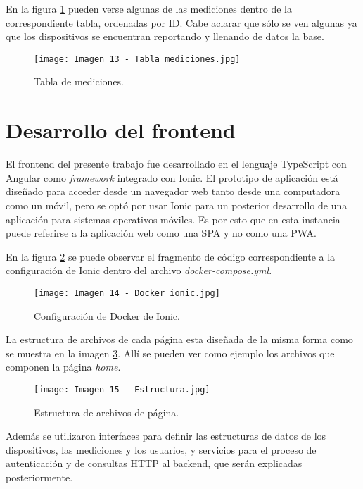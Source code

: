 En la figura \ref{fig:13} pueden verse algunas de las mediciones dentro de la correspondiente tabla, ordenadas por ID. Cabe aclarar que sólo se ven algunas ya que los dispositivos se encuentran reportando y llenando de datos la base.

\begin{figure}[h]
\centering
\texttt{[image: Imagen 13 - Tabla mediciones.jpg]}
\caption[Tabla mediciones]{Tabla de mediciones. \footnotemark}
\label{fig:13}
\end{figure}

\section{Desarrollo del frontend}

El frontend del presente trabajo fue desarrollado en el lenguaje TypeScript con Angular como \textit{framework} integrado con Ionic. El prototipo de aplicación está diseñado para acceder desde un navegador web tanto desde una computadora como un móvil, pero se optó por usar Ionic para un posterior desarrollo de una aplicación para sistemas operativos móviles. Es por esto que en esta instancia puede referirse a la aplicación web como una SPA y no como una PWA.

En la figura \ref{fig:14} se puede observar el fragmento de código correspondiente a la configuración de Ionic dentro del archivo \textit{docker-compose.yml}.

\begin{figure}[h]
\centering
\texttt{[image: Imagen 14 - Docker ionic.jpg]}
\caption[Configuración Ionic]{Configuración de Docker de Ionic. \footnotemark}
\label{fig:14}
\end{figure}

La estructura de archivos de cada página esta diseñada de la misma forma como se muestra en la imagen \ref{fig:15}. Allí se pueden ver como ejemplo los archivos que componen la página \textit{home}.

\begin{figure}[h]
\centering
\texttt{[image: Imagen 15 - Estructura.jpg]}
\caption[Estructura página]{Estructura de archivos de página. \footnotemark}
\label{fig:15}
\end{figure}

Además se utilizaron interfaces para definir las estructuras de datos de los dispositivos, las mediciones y los usuarios, y servicios para el proceso de autenticación y de consultas HTTP al backend, que serán explicadas posteriormente.

